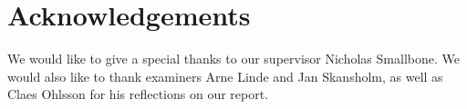 \thispagestyle{plain}			%
\section*{Acknowledgements}
We would like to give a special thanks to our supervisor Nicholas Smallbone. We would also
like to thank examiners Arne Linde and Jan Skansholm, as well as Claes Ohlsson for his reflections on our report.


\newpage				%
\thispagestyle{empty}
\mbox{}
